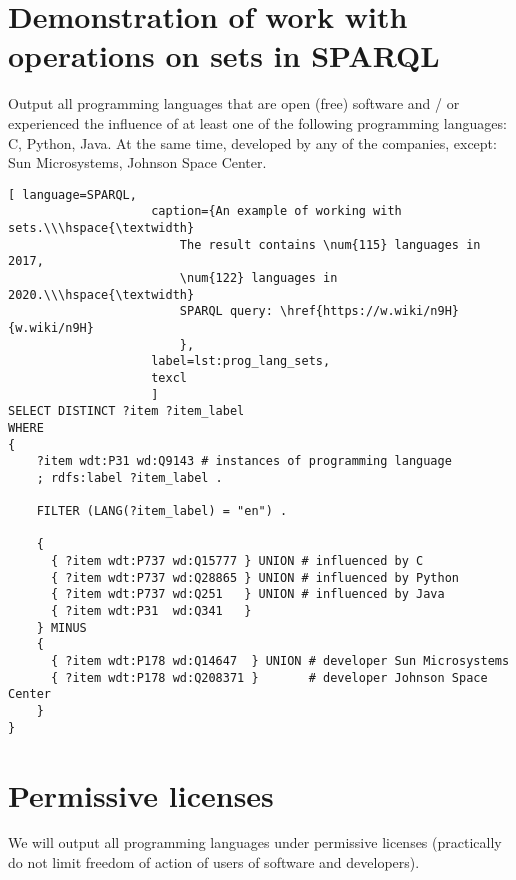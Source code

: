 \section{Demonstration of work with operations on sets in SPARQL}

Output all programming languages that are open (free) software and / or experienced the influence of at least one of the following programming languages: C, Python, Java. At the same time, developed by any of the companies, except: Sun Microsystems, Johnson Space Center.

\begin{lstlisting}[ language=SPARQL, 
                    caption={An example of working with sets.\\\hspace{\textwidth}
                        The result contains \num{115} languages in 2017, 
                        \num{122} languages in 2020.\\\hspace{\textwidth}
                        SPARQL query: \href{https://w.wiki/n9H}{w.wiki/n9H}
                        },
                    label=lst:prog_lang_sets,
                    texcl 
                    ]
SELECT DISTINCT ?item ?item_label
WHERE
{
    ?item wdt:P31 wd:Q9143 # instances of programming language
    ; rdfs:label ?item_label . 

    FILTER (LANG(?item_label) = "en") . 

    {
      { ?item wdt:P737 wd:Q15777 } UNION # influenced by C
      { ?item wdt:P737 wd:Q28865 } UNION # influenced by Python
      { ?item wdt:P737 wd:Q251   } UNION # influenced by Java
      { ?item wdt:P31  wd:Q341   }
    } MINUS 
  	{ 
      { ?item wdt:P178 wd:Q14647  } UNION # developer Sun Microsystems
      { ?item wdt:P178 wd:Q208371 }       # developer Johnson Space Center
    }  
}
\end{lstlisting}%

\section{Permissive licenses}
We will output all programming languages under permissive licenses (practically do not limit freedom of action of users of software and developers).

